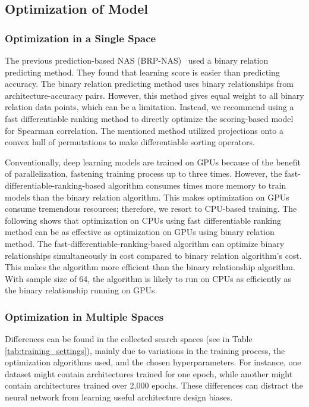 \documentclass[lettersize,journal]{IEEEtran}
\begin{document}
\subsection{Optimization of Model} \label{sec:model_opt}

        \subsubsection{Optimization in a Single Space} The previous prediction-based NAS (BRP-NAS) \cite{BRP-NAS}\ used a binary relation predicting method. They found that learning score is easier than predicting accuracy. The binary relation predicting method uses  binary relationships from  architecture-accuracy pairs. However, this method gives equal weight to all binary relation data points, which can be a limitation. Instead, we recommend using a fast differentiable ranking method \cite{fast-soft-sort} to directly optimize the scoring-based model for Spearman correlation. The mentioned method utilized projections onto a convex hull of permutations to make differentiable sorting operators.

            Conventionally, deep learning models are trained on GPUs because of the benefit of parallelization, fastening training process up to three times. However, the fast-differentiable-ranking-based algorithm consumes  times more memory to train models than the binary relation algorithm. This makes optimization on GPUs consume tremendous resources; therefore, we resort to CPU-based training. The following shows that optimization on CPUs using fast differentiable ranking method can be as effective as optimization on GPUs using binary relation method. The fast-differentiable-ranking-based algorithm can optimize  binary relationships simultaneously in  cost compared to binary relation algorithm's  cost. This makes the algorithm  more efficient than the binary relationship algorithm. With sample size of 64, the algorithm is likely to run on CPUs as efficiently as the binary relationship running on GPUs.
            


        \subsubsection{Optimization in Multiple Spaces} \label{sec:mulspace}
             Differences can be found in the collected search spaces (see in Table \ref{tab:training_settings}), mainly due to variations in the training process, the optimization algorithms used, and the chosen hyperparameters. For instance, one dataset might contain architectures trained for one epoch, while another might contain architectures trained over 2,000 epochs. These differences can distract the neural network from learning useful architecture design biases.
            
\end{document}
